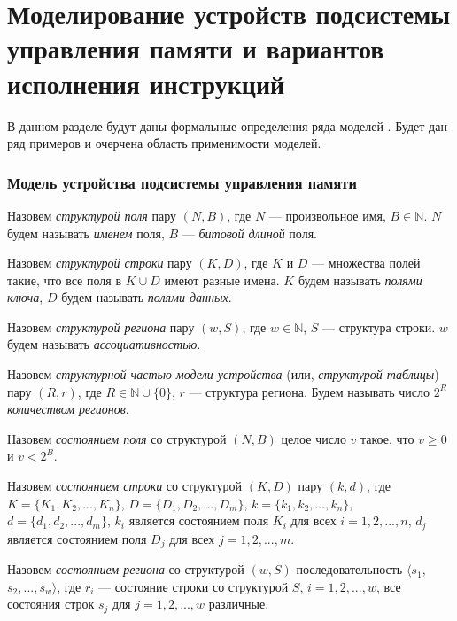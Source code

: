 \section{Моделирование устройств подсистемы \\управления памяти и вариантов исполнения инструкций}\label{sec:state_model_section}

В данном разделе будут даны формальные определения ряда моделей%
. Будет дан ряд примеров и очерчена область применимости моделей.

\subsubsection*{Модель устройства подсистемы управления памяти}


Назовем \emph{структурой поля} пару $(N, B)$, где $N$ --- произвольное имя, $B \in \mathds{N}$. $N$ будем называть \emph{именем} поля, $B$ --- \emph{битовой длиной} поля.

Назовем \emph{структурой строки} пару $(K, D)$, где $K$ и $D$ --- множества полей такие, что все поля в $K \cup D$ имеют разные имена. $K$ будем называть \emph{полями ключа}, $D$ будем называть \emph{полями данных}.

Назовем \emph{структурой региона} пару $(w, S)$, где $w \in \mathds{N}$, $S$ --- структура строки. $w$ будем называть \emph{ассоциативностью}.

Назовем \emph{структурной частью модели устройства} (или, \emph{структурой таблицы}) пару $(R, r)$, где $R \in \mathds{N} \cup \{0\}$, $r$ --- структура региона. Будем называть число $2^R$ \emph{количеством регионов}.

Назовем \emph{состоянием поля} со структурой $(N, B)$ целое число $v$ такое, что $v \geqslant 0$ и $v < 2^B$.

Назовем \emph{состоянием строки} со структурой $(K, D)$ пару $(k, d)$, где $K = \{K_1, K_2, ..., K_n\}$, $D = \{D_1, D_2, ..., D_m\}$, $k = \{k_1, k_2, ..., k_n\}$, $d = \{d_1, d_2, ..., d_m\}$, $k_i$ является состоянием поля $K_i$ для всех $i = 1, 2, ..., n$, $d_j$ является состоянием поля $D_j$ для всех $j = 1, 2, ..., m$.

Назовем \emph{состоянием региона} со структурой $(w, S)$ последовательность $\langle s_1,$ $s_2, ..., s_w\rangle$, где $r_i$ --- состояние строки со структурой $S$, $i = 1, 2, ..., w$, все состояния строк $s_j$ для $j = 1, 2, ..., w$ различные.

